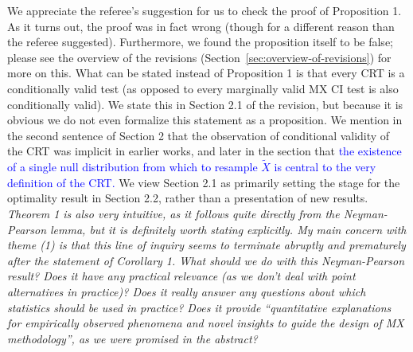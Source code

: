 \documentclass[12pt]{article}
\begin{document}
\noindent We appreciate the referee's suggestion for us to check the proof of Proposition 1. As it turns out, the proof was in fact wrong (though for a different reason than the referee suggested). Furthermore, we found the proposition itself to be false; please see the overview of the revisions (Section~\ref{sec:overview-of-revisions}) for more on this. What can be stated instead of Proposition 1 is that every CRT is a conditionally valid test (as opposed to every marginally valid MX CI test is also conditionally valid). We state this in Section 2.1 of the revision, but because it is obvious we do not even formalize this statement as a proposition. We mention in the second sentence of Section 2 that the observation of conditional validity of the CRT was implicit in earlier works, and later in the section that \textcolor{blue}{the existence of a single null distribution from which to resample $\widetilde X$ is central to the very definition of the CRT.} We view Section 2.1 as primarily setting the stage for the optimality result in Section 2.2, rather than a presentation of new results.
\\

\textsl{Theorem 1 is also very intuitive, as it follows quite directly from the Neyman-Pearson lemma, but it is definitely worth stating explicitly. My main concern with theme (1) is that this line of inquiry seems to terminate abruptly and prematurely after the statement of Corollary 1. What should we do with this Neyman-Pearson result? Does it have any practical relevance (as we don’t deal with point alternatives in practice)? Does it really answer any questions about which statistics should be used in practice? Does it provide “quantitative explanations for empirically observed phenomena and novel insights to guide the design of MX methodology”, as we were promised in the abstract?} 
\\
\end{document}
